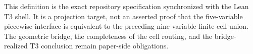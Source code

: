 This definition is the exact repository specification synchronized with the
Lean T3 shell.  It is a projection target, not an asserted proof that the
five-variable piecewise interface is equivalent to the preceding
nine-variable finite-cell union.  The geometric bridge, the completeness of
the cell routing, and the bridge-realized T3 conclusion remain paper-side
obligations.
